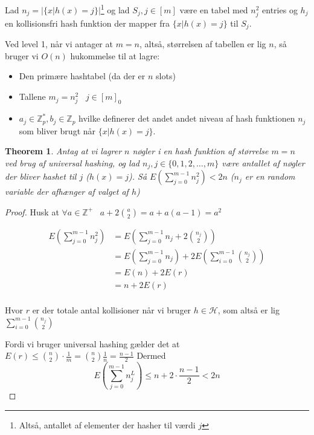 \documentclass[11pt]{article}
\newtheorem{theorem}{Theorem}
\theoremstyle{definition}
\theoremstyle{remark}
\begin{document}
Lad $n_{j} = |\{x | h(x) = j\}|$\footnote{Altså, antallet af elementer der hasher til værdi $j$} og lad $S_{j}, j \in [m]$ være en tabel med $n_{j}^{2}$ entries og $h_{j}$ en kollisionsfri hash funktion der mapper fra $\{x | h(x) = j\}$ til $S_{j}$.

Ved level 1, når vi antager at $m = n$, altså, størrelsen af tabellen er lig $n$, så bruger vi $O(n)$ hukommelse til at lagre:
\begin{itemize}
\item Den primære hashtabel (da der er $n$ slots)
\item Tallene $m_{j} = n_{j}^{2}\;\;\;j \in [m]_{0}$
\item $a_{j} \in \mathbb{Z}_{p}^{*}, b_{j} \in \mathbb{Z}_{p}$ hvilke definerer det andet andet niveau af hash funktionen $n_{j}$ som bliver brugt når $\{x | h(x) = j\}$.
\end{itemize}

\begin{theorem}
Antag at vi lagrer $n$ nøgler i en hash funktion af størrelse $m = n$ ved brug af universal hashing, og lad $n_{j}, j \in \{0,1,2, \ldots, m\}$ være antallet af nøgler der bliver hashet til $j$ ($h(x) = j$). Så $E\left( \sum_{j=0}^{m-1}n_{j}^{2}  \right) < 2n$ ($n_{j}$ er en random variable der afhænger af valget af $h$)
\end{theorem}

\begin{proof}
  Husk at $\forall a \in \mathbb{Z}^{+}\;\;\; a + 2 \binom{a}{2} = a + a(a-1) = a^{2}$

  \begin{equation}
    \label{}
\begin{split}
  E \left( \sum_{j=0}^{m-1}n_{j}^{2} \right) &= E \left( \sum_{j=0}^{m-1} n_{j} + 2 \binom{n_{j}}{2} \right)\\
                                          &= E \left( \sum_{j=0}^{m-1}n_{j} \right) + 2E(\sum_{i=0}^{m-1}\binom{n_{j}}{2})\\
                                          &= E(n) + 2E(r)\\
  &= n + 2 E(r)\\
\end{split}
  \end{equation}

  Hvor $r$ er der totale antal kollisioner når vi bruger $h \in \mathcal{H}$, som altså er lig $\sum_{i=0}^{m-1}\binom{n_{j}}{2}$

  Fordi vi bruger universal hashing gælder det at $E(r) \leq \binom{n}{2} \cdot \frac{1}{m} = \binom{n}{2} \frac{1}{n} = \frac{n-1}{2}$
  Dermed \[ E \left( \sum_{j=0}^{m-1}n_{j}^{L} \right) \leq n + 2 \cdot \frac{n-1}{2} < 2n\]
\end{proof}
\end{document}

